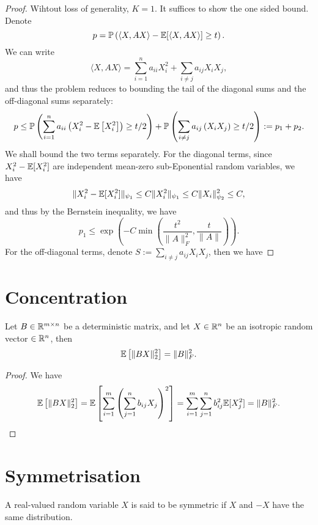 \begin{proof}
	Wihtout loss of generality, \(K=1\). It suffices to show the one sided bound. Denote
	\begin{equation*}
		p=\mathbb{P}\left(\langle X, AX\rangle-\mathbb{E}[\langle X, AX\rangle]\geq t\right).
	\end{equation*}
	We can write
	\begin{equation*}
		\langle X, AX\rangle=\sum_{i=1}^{n}a_{ii}X_{i}^{2}+\sum_{i\neq j}a_{ij}X_{i}X_{j},
	\end{equation*}
	and thus the problem reduces to bounding the tail of the diagonal sums and the off-diagonal sums separately:
	\begin{equation*}
		p\leq\mathbb{P}\left(\sum_{i=1}^{n}a_{ii}\left(X_{i}^{2}-\mathbb{E}\left[X_{i}^{2}\right]\right)\geq t/2\right)+\mathbb{P}\left(\sum_{i\neq j}a_{ij}\left(X_{i}X_{j}\right)\geq t/2\right):=p_{1}+p_{2}.
	\end{equation*}
	We shall bound the two terms separately. For the diagonal terms, since \(X_i^2-\mathbb{E}[X_i^2]\) are independent mean-zero sub-Eponential random variables, we have
	\begin{equation*}
		\|X_{i}^{2}-\mathbb{E}[X_{i}^{2}]\|_{\psi_{1}}\leq C\|X_{i}^{2}\|_{\psi_{1}}\leq C\|X_{i}\|_{\psi_{2}}^{2}\leq C,
	\end{equation*}
	and thus by the Bernstein inequality, we have
	\begin{equation*}
		p_{1}\leq\exp\left(-C\min\left(\frac{t^{2}}{\|A\|_{F}^{2}}, \frac{t}{\|A\|}\right)\right).
	\end{equation*}
	For the off-diagonal terms, denote \(S:=\sum_{i\neq j}a_{ij}X_{i}X_{j}\), then we have
\end{proof}

\section{Concentration}

\begin{lemma}
	Let \(B\in\mathbb{R}^{m\times n}\) be a deterministic matrix, and let \(X\in\mathbb{R}^{n}\) be an isotropic random vector \(\in\mathbb{R}^{n}\), then
	\begin{equation*}
		\mathbb{E}\left[\|BX\|_{2}^{2}\right]=\|B\|_{F}^{2}.
	\end{equation*}
\end{lemma}

\begin{proof}
	We have
	\begin{equation*}
		\mathbb{E}\left[\|BX\|_{2}^{2}\right]=\mathbb{E}\left[\sum_{i=1}^{m}\left(\sum_{j=1}^{n}b_{ij}X_{j}\right)^{2}\right]=\sum_{i=1}^{m}\sum_{j=1}^{n}b_{ij}^{2}\mathbb{E}[X_{j}^{2}]=\|B\|_{F}^{2}.
	\end{equation*}
\end{proof}

\section{Symmetrisation}

\begin{definition}
	A real-valued random variable \(X\) is said to be symmetric if \(X\) and \(-X\) have the same distribution.
\end{definition}
